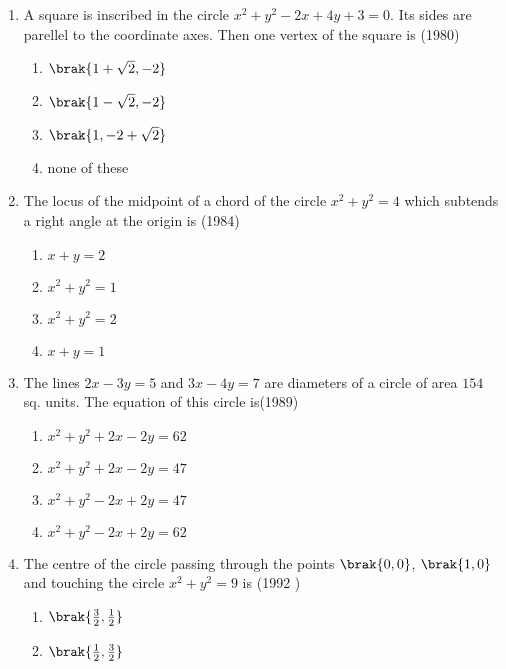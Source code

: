 \begin{enumerate}[label=\thesubsection.\arabic*.,ref=\thesubsection.\theenumi]
    \item A square is inscribed in the circle $x^{2} + y^{2} - 2x +4y +3= 0.$ Its sides are parellel to the coordinate axes. Then one vertex of the square is \hfill {(1980)}
    \begin{multicols}{2}
\begin{enumerate}
    		\item $\brak{1+\sqrt{2},  -2}$ 
    		\item $\brak{1-\sqrt{2},  -2}$
    		\item $\brak{1,  -2 +\sqrt{2}}$
    		\item none of these
    	\end{enumerate}
    \end{multicols}
    \item The locus of the midpoint of a chord of the circle $x^{2}+y^{2}=4$ which subtends a right angle at the origin is \hfill {(1984)}
    \begin{multicols}{2}
\begin{enumerate}
    	\item $x+y=2$
    	\item $x^{2}+y^{2}=1$
    	\item $x^{2}+y^{2}=2$
    	\item $x+y=1$
    \end{enumerate}
\end{multicols}
    \item The lines $2x-3y=5$ and $3x-4y=7$ are diameters of a circle of area $154$ sq. units. The equation of this circle is\hfill {(1989)}
    \begin{multicols}{2}
\begin{enumerate}
    	\item $x^{2}+y^{2}+2x-2y=62$
    	\item $x^{2}+y^{2}+2x-2y=47$
    	\item $x^{2}+y^{2}-2x+2y=47$
    	\item $x^{2}+y^{2}-2x+2y=62$
    \end{enumerate}
\end{multicols}
    \item The centre of the circle passing through the points $\brak{0, 0}$, $\brak{1, 0}$ and touching the circle $x^{2}+y^{2}=9$ is
    \hfill {(1992 )}
    \begin{multicols}{2}
\begin{enumerate}
    	\item $\brak{\frac{3}{2}, \frac{1}{2}}$
    	\item $\brak{\frac{1}{2}, \frac{3}{2}}$

\end{enumerate}
\end{multicols}
\end{enumerate}
